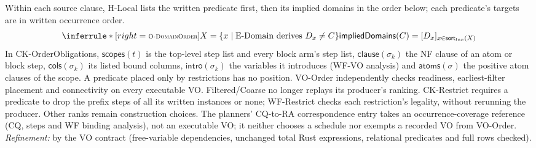 Within each source clause, H-Local lists the written predicate first, then
its implied domains in the order below; each predicate's targets are in
written occurrence order.
\[
\Rule{O-DomainOrder}{X=\{x\mid\text{E-Domain derives }D_x\ne C\}}
 {\mathsf{impliedDomains}(C)=[D_x]_{x\in\mathsf{sort}_{lex}(X)}}
\]
In CK-OrderObligations, $\mathsf{scopes}(t)$ is the top-level step list and every
block arm's step list, $\mathsf{clause}(\sigma_k)$ the NF clause of an atom or
block step, $\mathsf{cols}(\sigma_k)$ its listed bound columns,
$\mathsf{intro}(\sigma_k)$ the variables it introduces (WF-VO analysis) and
$\mathsf{atoms}(\sigma)$ the positive atom clauses of the scope. A predicate
placed only by restrictions has no position. VO-Order independently checks
readiness, earliest-filter placement and connectivity on every executable VO.
Filtered/Coarse no longer replays its producer's ranking. CK-Restrict
requires a predicate to drop the prefix steps of all its written instances or
none; WF-Restrict checks each restriction's legality, without rerunning the
producer. Other ranks remain construction choices.
The planners' CQ-to-RA correspondence entry takes an occurrence-coverage
reference (CQ, steps and WF binding analysis), not an executable VO; it neither
chooses a schedule nor exempts a recorded VO from VO-Order.
\emph{Refinement:} by the VO contract (free-variable dependencies,
unchanged total Rust expressions, relational predicates and full rows checked).

